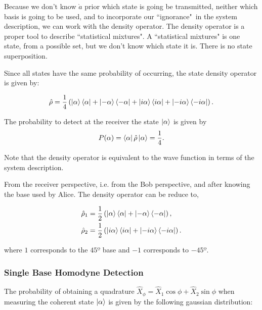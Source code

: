 Because we don't know $\grave{a}$ prior which state is going be transmitted, neither which basis is going to be used, and to incorporate our ``ignorance"\, in the system description, we can work with the density operator. The density operator is a proper tool to describe ``statistical mixtures". A ``statistical mixtures" is one state, from a possible set, but we don't know which state it is. There is no state superposition.

Since all states have the same probability of occurring, the state density operator is given by:

\begin{equation}\label{eq:statedensity}
\hat{\rho}=\frac{1}{4}\left(\ket{\alpha}\bra{\alpha}+\ket{-\alpha}\bra{-\alpha}+\ket{i\alpha}\bra{i\alpha}+\ket{-i\alpha}\bra{-i\alpha}\right).
\end{equation}

The probability to detect at the receiver the state $\ket{\alpha}$ is given by
\begin{equation}\label{eq:statedensity}
P(\alpha)=\bra{\alpha}\hat{\rho}\ket{\alpha}=\frac{1}{4}.
\end{equation}


Note that the density operator is equivalent to the wave function in terms of the system description.

From the receiver perspective, i.e. from the Bob perspective, and after knowing the base used by Alice.
The density operator can be reduce to,

\begin{align}
\hat{\rho}_1&=\frac{1}{2}\left(\ket{\alpha}\bra{\alpha}+\ket{-\alpha}\bra{-\alpha}\right),\label{eq:statedensity1} \\
\hat{\rho}_2&=\frac{1}{2}\left(\ket{i\alpha}\bra{i\alpha}+\ket{-i\alpha}\bra{-i\alpha}\right).\label{eq:statedensity2}
\end{align}

where $1$ corresponds to the $45º$ base and $-1$ corresponds to $-45º$.

\subsubsection*{Single Base Homodyne Detection}



The probability of obtaining a quadrature $\hat{X}_\phi=\hat{X}_1\cos\phi+\hat{X}_2\sin\phi$ when measuring the coherent state $\ket{\alpha}$ is given by the following gaussian distribution:

